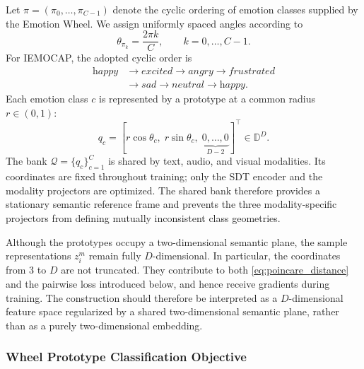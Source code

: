 \documentclass[letterpaper,journal]{IEEEtran}
\begin{document}
Let \(\pi=(\pi_0,\ldots,\pi_{C-1})\) denote the cyclic ordering of emotion
classes supplied by the Emotion Wheel. We assign uniformly spaced angles
according to
\begin{equation}
    \theta_{\pi_k}=\frac{2\pi k}{C},
    \qquad k=0,\ldots,C-1.
    \label{eq:wheel_angles}
\end{equation}
For IEMOCAP, the adopted cyclic order is
\begin{equation}
\begin{aligned}
    \textit{happy}&\rightarrow\textit{excited}\rightarrow
    \textit{angry}\rightarrow\textit{frustrated}\\
    &\rightarrow\textit{sad}\rightarrow\textit{neutral}
    \rightarrow\textit{happy}.
\end{aligned}
    \label{eq:iemocap_wheel_order}
\end{equation}
Each emotion class \(c\) is represented by a prototype at a common radius
\(r\in(0,1)\):
\begin{equation}
    q_c=
    \left[r\cos\theta_c,\;r\sin\theta_c,\;
    \underbrace{0,\ldots,0}_{D-2}\right]^{\top}
    \in\mathbb{D}^{D}.
    \label{eq:fixed_wheel_prototype}
\end{equation}
The bank \(\mathcal{Q}=\{q_c\}_{c=1}^{C}\) is shared by text, audio, and
visual modalities. Its coordinates are fixed throughout training; only the SDT
encoder and the modality projectors are optimized. The shared bank therefore
provides a stationary semantic reference frame and prevents the three
modality-specific projectors from defining mutually inconsistent class
geometries.

Although the prototypes occupy a two-dimensional semantic plane, the sample
representations \(z_i^{m}\) remain fully \(D\)-dimensional. In particular, the
coordinates from 3 to \(D\) are not truncated. They contribute to both
\eqref{eq:poincare_distance} and the pairwise loss introduced below, and hence
receive gradients during training. The construction should therefore be
interpreted as a \(D\)-dimensional feature space regularized by a shared
two-dimensional semantic plane, rather than as a purely two-dimensional
embedding.

\subsubsection{Wheel Prototype Classification Objective}
\end{document}
